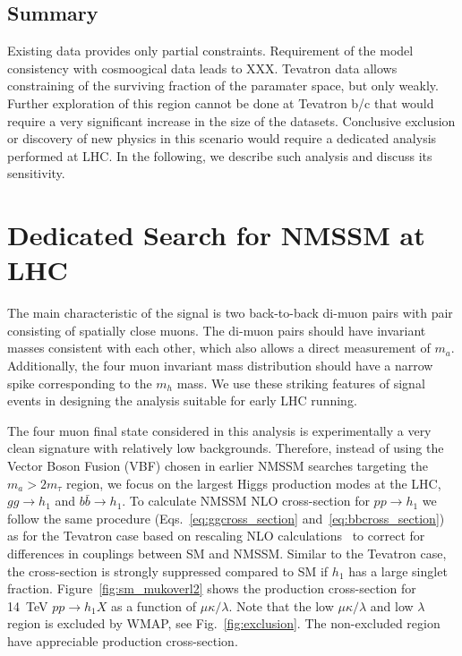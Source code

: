 \documentclass[aps,prl,twocolumn,nofootinbib,superscriptaddress]{revtex4}
\begin{document}
{\subsection{Summary}
Existing data provides only partial constraints. Requirement of the model consistency with cosmoogical
data leads to XXX. Tevatron data allows constraining of the surviving fraction of the paramater space, 
but only weakly. Further exploration of this region cannot be done at Tevatron b/c that would require
a very significant increase in the size of the datasets. Conclusive exclusion or discovery of new physics
in this scenario would require a dedicated analysis performed at LHC. In the following, we describe such
analysis and discuss its sensitivity.


\section{Dedicated Search for NMSSM at LHC}

The main characteristic of the signal is two back-to-back di-muon pairs with pair consisting of 
spatially close muons. The di-muon pairs should have invariant masses consistent with each other, 
which also allows a direct measurement of $m_a$. Additionally, the four muon invariant mass distribution 
should have a narrow spike corresponding to the $m_h$ mass. We use these striking features of signal 
events in designing the analysis suitable for early LHC running.

The four muon final state considered in this analysis is experimentally a very clean signature 
with relatively low backgrounds. Therefore, instead of using the Vector Boson Fusion (VBF)
chosen in earlier NMSSM searches targeting the $m_a>2 m_\tau$ region, we focus on the largest 
Higgs production modes at the LHC, $gg \to h_1$ and $b\bar{b} \to h_1$.  To calculate NMSSM NLO 
cross-section for $pp \to h_1$ we follow the same procedure (Eqs.~\ref{eq:ggcross_section} and~\ref{eq:bbcross_section})
as for the Tevatron case based on rescaling NLO calculations~\cite{Spira:1995rr,Balazs:1998sb} 
to correct for differences in couplings between SM and NMSSM. Similar to the Tevatron case, the 
cross-section is strongly suppressed compared to SM if $h_1$ 
has a large singlet fraction. Figure~\ref{fig:sm_mukoverl2} shows the production cross-section for 14~TeV $pp \to h_1 X$ 
as a function of $\mu\kappa/\lambda$.  Note that the low $\mu\kappa/\lambda$ and low $\lambda$ 
region is excluded by WMAP, see Fig.~\ref{fig:exclusion}. The non-excluded region have appreciable
production cross-section.

}
\end{document}
